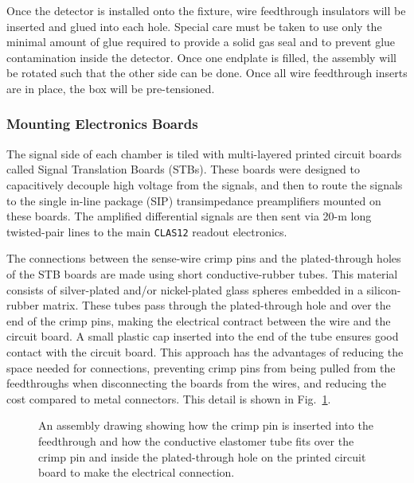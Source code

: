 Once the detector is installed onto the fixture, wire feedthrough 
insulators will be inserted and glued into each hole. Special care must be 
taken to use only the minimal amount of glue required to provide a solid gas 
seal and to prevent glue contamination inside the detector.  Once one 
endplate is filled, the assembly will be rotated such that the other side 
can be done.  Once all wire feedthrough inserts are in place, the box 
will be pre-tensioned.

\subsubsection{Mounting Electronics Boards}

The signal side of each chamber is tiled with multi-layered printed circuit 
boards called Signal Translation Boards (STBs).  These boards were designed 
to capacitively decouple high voltage from the signals, and then to route 
the signals to the single in-line package (SIP) transimpedance preamplifiers 
mounted on these boards.  The amplified differential signals are then sent 
via 20-m long twisted-pair lines to the main {\tt CLAS12} readout electronics.

The connections between the sense-wire crimp pins and the plated-through holes 
of the STB boards are made using short conductive-rubber tubes.  This material 
consists of silver-plated and/or nickel-plated glass spheres embedded in a 
silicon-rubber matrix.  These tubes pass through the plated-through hole and 
over the end of the crimp pins, making the electrical contract between the 
wire and the circuit board.  A small plastic cap inserted into the end of the 
tube ensures good contact with the circuit board.  This approach has the 
advantages of reducing the space needed for connections, preventing crimp pins 
from being pulled from the feedthroughs when disconnecting the boards from the 
wires, and reducing the cost compared to metal connectors.  This detail is 
shown in Fig.~\ref{crimp}.

\begin{figure}[htbp]
\vspace{8.0cm}
\caption{\small{An assembly drawing showing how the crimp pin is inserted
into the feedthrough and how the conductive elastomer tube fits over the 
crimp pin and inside the plated-through hole on the printed circuit board to 
make the electrical connection.}}
\label{crimp}
\end{figure}

